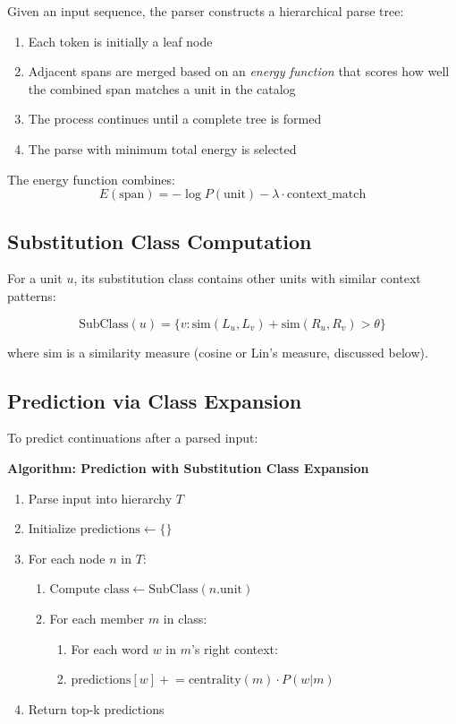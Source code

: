 \documentclass[11pt,a4paper]{article}
\begin{document}
Given an input sequence, the parser constructs a hierarchical parse tree:

\begin{enumerate}
    \item Each token is initially a leaf node
    \item Adjacent spans are merged based on an \emph{energy function} that scores how well the combined span matches a unit in the catalog
    \item The process continues until a complete tree is formed
    \item The parse with minimum total energy is selected
\end{enumerate}

The energy function combines:
\begin{equation}
    E(\text{span}) = -\log P(\text{unit}) - \lambda \cdot \text{context\_match}
\end{equation}

\subsection{Substitution Class Computation}

For a unit $u$, its substitution class contains other units with similar context patterns:

\begin{equation}
    \text{SubClass}(u) = \{v : \text{sim}(L_u, L_v) + \text{sim}(R_u, R_v) > \theta\}
\end{equation}

where $\text{sim}$ is a similarity measure (cosine or Lin's measure, discussed below).

\subsection{Prediction via Class Expansion}

To predict continuations after a parsed input:

\medskip
\noindent\textbf{Algorithm: Prediction with Substitution Class Expansion}
\begin{enumerate}
    \item Parse input into hierarchy $T$
    \item Initialize $\text{predictions} \gets \{\}$
    \item For each node $n$ in $T$:
    \begin{enumerate}
        \item Compute $\text{class} \gets \text{SubClass}(n.\text{unit})$
        \item For each member $m$ in class:
        \begin{enumerate}
            \item For each word $w$ in $m$'s right context:
            \item[] $\text{predictions}[w] \mathrel{+}= \text{centrality}(m) \cdot P(w|m)$
        \end{enumerate}
    \end{enumerate}
    \item Return top-k predictions
\end{enumerate}
\medskip
\end{document}

